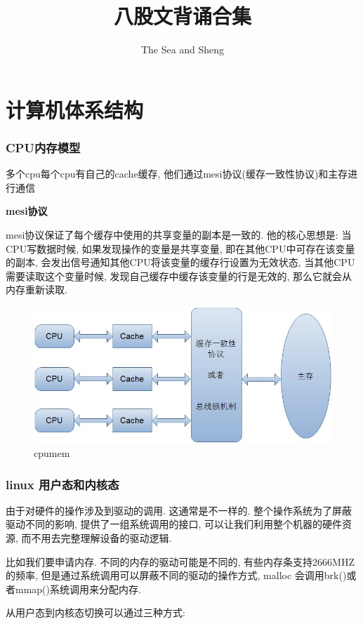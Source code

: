 \documentclass[UTF8]{ctexart}
\begin{document}
	
	\title{八股文背诵合集}
	\author{The Sea and Sheng}
	\maketitle
	
	\tableofcontents
	\newpage
\section{计算机体系结构}
\subsubsection{CPU内存模型}
多个cpu每个cpu有自己的cache缓存, 他们通过mesi协议(缓存一致性协议)和主存进行通信

\textbf{mesi协议}

mesi协议保证了每个缓存中使用的共享变量的副本是一致的. 他的核心思想是: 当CPU写数据时候, 如果发现操作的变量是共享变量, 即在其他CPU中可存在该变量的副本, 会发出信号通知其他CPU将该变量的缓存行设置为无效状态, 当其他CPU需要读取这个变量时候, 发现自己缓存中缓存该变量的行是无效的, 那么它就会从内存重新读取. 

\begin{figure}
	\centering
	\includegraphics[width=0.7\linewidth]{figures/cpumem.jpg}
	\caption{cpumem}
	\label{fig:cpumem}
\end{figure}

\subsubsection{linux 用户态和内核态}
由于对硬件的操作涉及到驱动的调用. 这通常是不一样的. 整个操作系统为了屏蔽驱动不同的影响, 提供了一组系统调用的接口, 可以让我们利用整个机器的硬件资源, 而不用去完整理解设备的驱动逻辑. 

比如我们要申请内存. 不同的内存的驱动可能是不同的, 有些内存条支持2666MHZ的频率, 但是通过系统调用可以屏蔽不同的驱动的操作方式, malloc 会调用brk()或者mmap()系统调用来分配内存.

从用户态到内核态切换可以通过三种方式:
\end{document}
